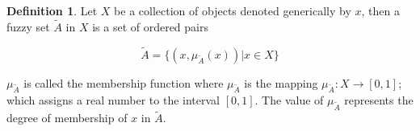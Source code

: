 \documentclass[11pt,a4paper,final]{article}
\theoremstyle{definition}
\newtheorem{definition}{Definition}[section]
\begin{document}
\begin{definition}
Let $X$ be a collection of objects denoted generically by $x$, then a fuzzy set $\tilde{A}$ in $X$ is a set of ordered
pairs

\begin{equation}
\tilde{A} = \{(x, \mu_{\tilde{A}}(x))| x\in X\}
\end{equation}

\noindent
$\mu_{\tilde{A}}$ is called the membership function where $\mu_{\tilde{A}}$ is the mapping $\mu_{\tilde{A}} : X
\rightarrow [0,1]$; which assigns a real number to the interval $[0,1]$. The value of $\mu_{\tilde{A}}$ represents the
degree of membership of $x$ in $\tilde{A}$.
\end{definition}



\end{document}
